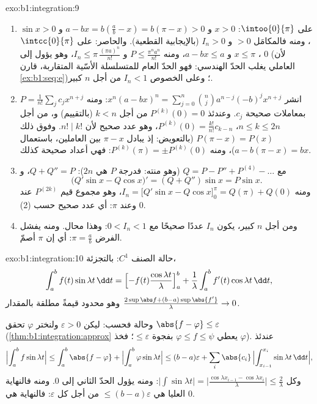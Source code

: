 \begin{solution}{exo:b1:integration:9}
\begin{enumerate}
  \item على $\intoo{0}{\pi}$: $x > 0$ و $a - bx = b(\frac ab - x) =
        b(\pi - x) > 0$ و $\sin x > 0$، ومنه فالمكامَل $> 0$
        و $I_n > 0$ (بالإيجابية القطعية). والحاصر: على
        $\intcc{0}{\pi}$، $x \leq \pi$ و $a - bx \leq a$، ومنه $P
        \leq \frac{\pi^n a^n}{n!}$ و $I_n \leq
        \pi\,\frac{(\pi a)^n}{n!}$، وهو يؤول إلى $0$ (لأن
        العاملي يغلب الحدّ الهندسي: فهو الحدّ العام
        للمتسلسلة الأسّية المتقاربة، قارن
        \cref{ex:b1:seq:e})؛ وعلى الخصوص $I_n < 1$ من أجل $n$ كبير.
  \item انشر $x^n(a - bx)^n = \sum_{j=0}^{n} \binom nj a^{n-j}
        (-b)^j x^{n+j}$: ومنه $P = \frac{1}{n!}\sum_j c_j x^{n+j}$
        بمعاملات صحيحة $c_j$. وعندئذ $P^{(k)}(0) = 0$ من أجل $k < n$
        (بالتقييم) و، من أجل $n \leq k \leq 2n$، $P^{(k)}(0) =
        \frac{k!}{n!} c_{k-n}$، وهو عدد صحيح لأن $n! \mid k!$.
        وفوق ذلك $P(\pi - x) = P(x)$ (بالتعويض: إذ يبادل $\pi - x$
        بين العاملين، باستعمال $a - b(\pi - x) = bx$)، ومنه $P^{(k)}(\pi)
        = \pm P^{(k)}(0)$: فهي أعداد صحيحة كذلك.
  \item مع $Q = P - P'' + P^{(4)} - \dots$ (وهو منته: فدرجة $P$ هي
        $2n$): $Q + Q'' = P$، و
        \[
        \bigl(Q'\sin x - Q\cos x\bigr)' = (Q + Q'')\sin x = P\sin x .
        \]
        ومنه $I_n = \bigl[Q'\sin x - Q\cos x\bigr]_0^{\pi} = Q(\pi)
        + Q(0)$، وهو مجموع قيم $P^{(2k)}$ عند $0$ وعند $\pi$: أي
        عدد صحيح حسب (2).
  \item ومن أجل $n$ كبير، يكون $I_n$ عددًا صحيحًا مع $0 < I_n < 1$:
        وهذا محال. ومنه يفشل الفرض $\pi = \frac ab$: أي إن $\pi$
        أصمّ.
\end{enumerate}
\end{solution}

\begin{solution}{exo:b1:integration:10}
حالة الصنف $C^1$: بالتجزئة،
\[
\int_a^b f(t)\sin\lambda t\,\dd t
= \Bigl[-f(t)\frac{\cos\lambda t}{\lambda}\Bigr]_a^b
+ \frac{1}{\lambda}\int_a^b f'(t)\cos\lambda t\,\dd t,
\]
وهو محدود قيمةً مطلقة بالمقدار $\frac{2\sup\abs f + (b - a)\sup\abs{f'}}
{\lambda} \to 0$.

وحالة  فحسب: ليكن $\varepsilon > 0$ ولنختر 
$\varphi$ تحقق $\abs{f - \varphi} \leq \varepsilon$
(\cref{thm:b1:integration:approx} يعطي $\varphi \leq f \leq
\psi$ بفجوة $\leq\varepsilon$؛ فخذ $\varphi$). عندئذ
\[
\Bigl|\int_a^b f\sin\lambda t\Bigr|
\leq \int_a^b \abs{f - \varphi}
+ \Bigl|\int_a^b \varphi \sin\lambda t\Bigr|
\leq (b-a)\varepsilon
+ \sum_i \abs{c_i}\,\Bigl|\int_{x_{i-1}}^{x_i} \sin\lambda t\,\dd
t\Bigr| ,
\]
وكل $\bigl|\int \sin \lambda t\bigr| = \bigl|\frac{\cos\lambda
x_{i-1} - \cos\lambda x_i}{\lambda}\bigr| \leq \frac{2}{\lambda}$:
ومنه يؤول الحدّ الثاني إلى $0$. ومنه فالنهاية العليا هي $\leq
(b-a)\varepsilon$ من أجل كل $\varepsilon$: فالنهاية هي $0$.
\end{solution}

